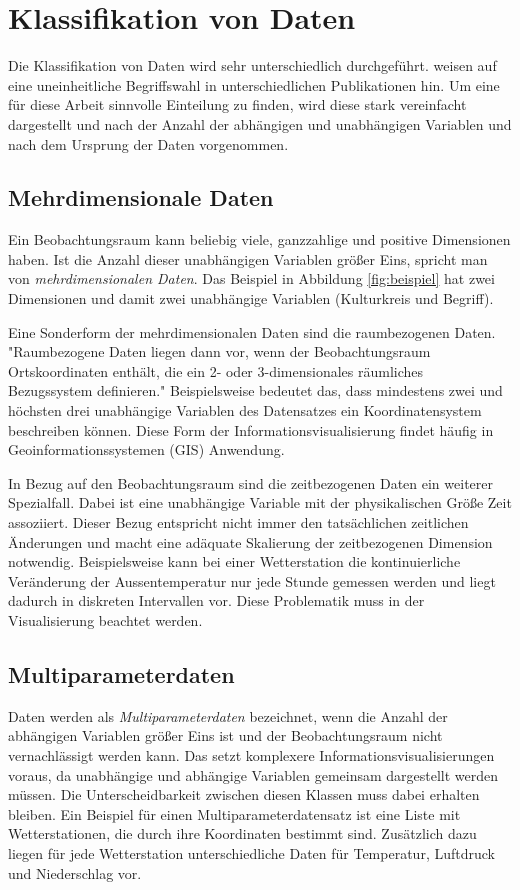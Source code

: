 \documentclass[a4paper, 12pt, DIVcalc, onepage, pdftex, headsepline, footsepline]{scrreprt}
\begin{document}
\section{Klassifikation von Daten}
\label{sec:KlassifikationDaten}

Die Klassifikation von Daten wird sehr unterschiedlich durchgeführt.
\citep{Schumann} weisen auf eine uneinheitliche Begriffswahl in unterschiedlichen
Publikationen hin.
Um eine für diese Arbeit sinnvolle Einteilung zu finden, wird diese stark vereinfacht dargestellt und nach der Anzahl der abhängigen und
unabhängigen Variablen und nach dem Ursprung der Daten vorgenommen.

\subsection{Mehrdimensionale Daten}
Ein Beobachtungsraum kann beliebig viele, ganzzahlige und positive Dimensionen haben. Ist die Anzahl
dieser unabhängigen Variablen größer Eins, spricht man von \textit{mehrdimensionalen Daten}. Das Beispiel
in Abbildung \ref{fig:beispiel} hat zwei Dimensionen und damit zwei unabhängige
Variablen (Kulturkreis und Begriff).

Eine Sonderform der mehrdimensionalen Daten sind die raumbezogenen Daten.
"Raumbezogene Daten liegen dann vor, wenn der Beobachtungsraum Ortskoordinaten enthält,
die ein 2- oder 3-dimensionales räumliches Bezugssystem definieren."\citep[S.\,220]{Schumann}
Beispielsweise bedeutet das, dass mindestens zwei und höchsten drei unabhängige Variablen des Datensatzes
ein Koordinatensystem beschreiben können. Diese Form der Informationsvisualisierung findet häufig
in Geoinformationssystemen (GIS) Anwendung.

In Bezug auf den Beobachtungsraum sind die zeitbezogenen Daten ein weiterer Spezialfall.
Dabei ist eine unabhängige Variable mit der physikalischen Größe Zeit assoziiert.
Dieser Bezug entspricht nicht immer den tatsächlichen zeitlichen Änderungen und macht
eine adäquate Skalierung der zeitbezogenen Dimension notwendig.
Beispielsweise kann bei einer Wetterstation die kontinuierliche Veränderung der Aussentemperatur
nur jede Stunde gemessen werden und liegt dadurch in diskreten Intervallen vor.
Diese Problematik muss in der Visualisierung beachtet werden.

\subsection{Multiparameterdaten}
Daten werden als \textit{Multiparameterdaten} bezeichnet, wenn die Anzahl der abhängigen Variablen größer Eins ist
und der Beobachtungsraum nicht vernachlässigt werden kann. Das setzt komplexere
Informationsvisualisierungen voraus, da unabhängige und abhängige Variablen gemeinsam
dargestellt werden müssen. Die Unterscheidbarkeit zwischen diesen Klassen muss dabei
erhalten bleiben.
Ein Beispiel für einen Multiparameterdatensatz ist eine Liste mit Wetterstationen, die durch ihre
Koordinaten bestimmt sind. Zusätzlich dazu liegen für jede Wetterstation unterschiedliche
Daten für Temperatur, Luftdruck und Niederschlag vor.
\end{document}
